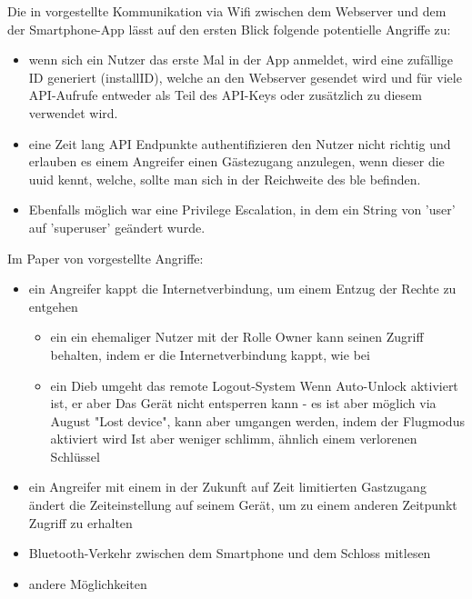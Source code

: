 	Die in  vorgestellte Kommunikation via Wifi zwischen dem Webserver und dem der Smartphone-App lässt auf den ersten Blick folgende potentielle Angriffe zu\cite{Fuller2017}\cite{Lariviere2015}: 
	\begin{itemize}
	    \item wenn sich ein Nutzer das erste Mal in der App anmeldet, wird eine zufällige ID generiert (installID), welche an den Webserver gesendet wird und für viele API-Aufrufe entweder als Teil des API-Keys oder zusätzlich zu diesem verwendet wird.
	    \item eine Zeit lang API Endpunkte authentifizieren den Nutzer nicht richtig und erlauben es einem Angreifer einen Gästezugang anzulegen, wenn dieser die \gls{uuid} kennt, welche, sollte man sich in der Reichweite des \gls{ble} befinden.
	    \item Ebenfalls möglich war eine Privilege Escalation, in dem ein String von 'user' auf 'superuser' geändert wurde.
	\end{itemize}
	
	Im Paper von \cite{Fuller2017} vorgestellte Angriffe:
	\begin{itemize}
	    \item ein Angreifer kappt die Internetverbindung, um einem Entzug der Rechte zu entgehen
	        \begin{itemize}
	            \item ein ein ehemaliger Nutzer mit der Rolle Owner kann seinen Zugriff behalten, indem er die Internetverbindung kappt, wie bei \cite{Ho2016}
	            \item ein Dieb umgeht das remote Logout-System
	                Wenn Auto-Unlock aktiviert ist, er aber Das Gerät nicht entsperren kann - es ist aber möglich via August "Lost device", kann aber umgangen werden, indem der Flugmodus aktiviert wird
	                Ist aber weniger schlimm, ähnlich einem verlorenen Schlüssel
	        \end{itemize}
	    \item ein Angreifer mit einem in der Zukunft auf Zeit limitierten Gastzugang ändert die Zeiteinstellung auf seinem Gerät, um zu einem anderen Zeitpunkt Zugriff zu erhalten
	    \item Bluetooth-Verkehr zwischen dem Smartphone und dem Schloss mitlesen
	    \item andere Möglichkeiten
	\end{itemize}
	
